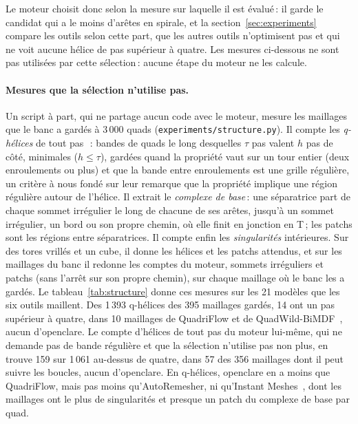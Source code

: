 \documentclass[11pt,a4paper]{article}
\begin{document}
Le moteur choisit donc selon la mesure sur laquelle il est évalué\,: il
garde le candidat qui a le moins d'arêtes en spirale, et la
section~\ref{sec:experiments} compare les outils selon cette part, que les
autres outils n'optimisent pas et qui ne voit aucune hélice de pas supérieur
à quatre. Les mesures ci-dessous ne sont pas utilisées par cette
sélection\,: aucune étape du moteur ne les calcule.

\paragraph{Mesures que la sélection n'utilise pas.}
Un script à part, qui ne partage aucun code avec le moteur, mesure les
maillages que le banc a gardés à 3\,000 quads
(\texttt{experiments/structure.py}). Il compte les \emph{q-hélices} de tout
pas~\cite{bommes2011structure}\,: bandes de quads le long desquelles $\tau$
pas valent $h$ pas de côté, minimales ($h \le \tau$), gardées quand la
propriété vaut sur un tour entier (deux enroulements ou plus) et que la bande
entre enroulements est une grille régulière, un critère à nous fondé sur leur
remarque que la propriété implique une région régulière autour de l'hélice. Il extrait le \emph{complexe de
base}\,: une séparatrice part de chaque sommet irrégulier le long de chacune
de ses arêtes, jusqu'à un sommet irrégulier, un bord ou son propre chemin, où
elle finit en jonction en T\,; les patchs sont les régions entre
séparatrices. Il compte enfin les \emph{singularités} intérieures. Sur des
tores vrillés et un cube, il donne les hélices et les patchs attendus, et sur
les maillages du banc il redonne les comptes du moteur, sommets irréguliers
et patchs (sans l'arrêt sur son propre chemin), sur chaque maillage où le
banc les a gardés. Le
tableau~\ref{tab:structure} donne ces mesures sur les 21 modèles que les six
outils maillent. Des 1\,393 q-hélices des 395 maillages gardés, 14 ont un pas
supérieur à quatre, dans 10 maillages de QuadriFlow et de
QuadWild-BiMDF~\cite{pietroni2021reliable,heistermann2023bimdf}, aucun
d'openclare. Le compte d'hélices de tout pas du moteur lui-même, qui ne
demande pas de bande régulière et que la sélection n'utilise pas non plus, en
trouve 159 sur 1\,061 au-dessus de quatre, dans 57 des 356 maillages dont il
peut suivre les boucles, aucun d'openclare. En q-hélices, openclare en a
moins que QuadriFlow, mais pas moins qu'AutoRemesher, ni qu'Instant
Meshes~\cite{jakob2015instant}, dont les maillages ont le plus de singularités et presque un patch du
complexe de base par quad.
\end{document}
